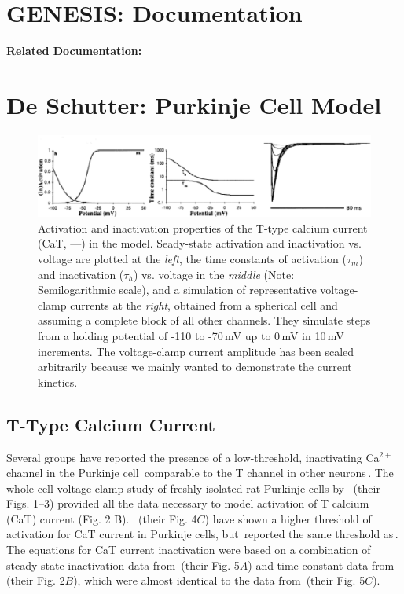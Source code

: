 \documentclass[12pt]{article}
\begin{document}
\section*{GENESIS: Documentation}

{\bf Related Documentation:}

\section*{De Schutter: Purkinje Cell Model}

\begin{figure}[h]
\centering
   \includegraphics[scale=0.75]{figures/DS1.2B.eps}
   \caption{Activation and inactivation properties of the T-type calcium current (CaT, ---) in the model. Seady-state activation and inactivation vs. voltage are plotted at the {\em left}, the time constants of activation ($\tau_m$) and inactivation ($\tau_h$) vs. voltage in the {\em middle} (Note: Semilogarithmic scale), and a simulation of representative voltage-clamp currents at the {\em right}, obtained from a spherical cell and assuming a complete block of all other channels. They simulate steps from a holding potential of -110 to -70\,mV up to 0\,mV in 10\,mV increments. The voltage-clamp current amplitude has been scaled arbitrarily because we mainly wanted to demonstrate the current kinetics.}
   \label{fig:DS1.2B}
\end{figure}

\subsection*{T-Type Calcium Current}

Several groups have reported the presence of a low-threshold, inactivating Ca$^{2+}$ channel in the Purkinje
cell\,\cite{Gruol:1990vn, Hirano:1989uq, Kaneda:1990ys} comparable to the T channel in other neurons\,\cite{Fox:1987zr}. The whole-cell voltage-clamp study of freshly isolated rat Purkinje cells by \,\cite{Kaneda:1990ys} (their Figs. 1--3) provided all the data necessary to model activation of T calcium (CaT) current (Fig. 2 B). \,\cite{Hirano:1989uq} (their Fig. 4$C$) have shown a higher threshold of activation for CaT current in Purkinje cells, but\,\cite{Gruol:1990vn} reported the same threshold as\,\cite{Kaneda:1990ys}. The equations for CaT current inactivation were based on a combination of steady-state inactivation data from\,\cite{Hirano:1989uq} (their Fig. 5$A$) and time constant data from\,\cite{Kaneda:1990ys} (their Fig. 2$B$), which were almost identical to the data from\,\cite{Hirano:1989uq} (their Fig. 5$C$).



\end{document}
